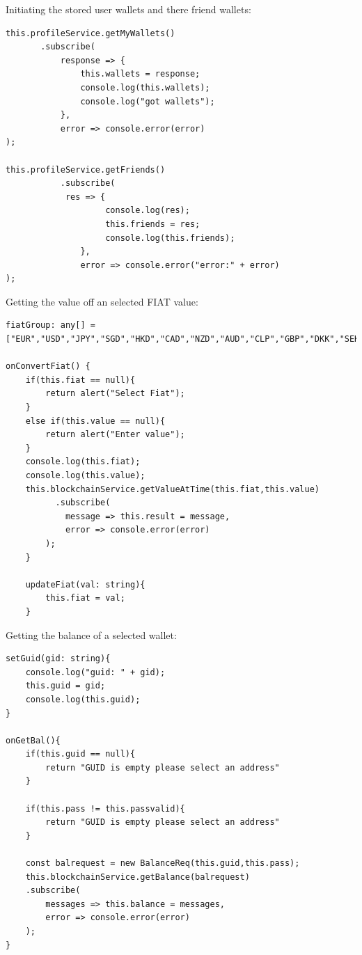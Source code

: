 Initiating the stored user wallets and there friend wallets:
\begin{lstlisting}
this.profileService.getMyWallets()
       .subscribe(
           response => {
               this.wallets = response;
               console.log(this.wallets);
               console.log("got wallets");
           },
           error => console.error(error)
);

this.profileService.getFriends()
           .subscribe(
            res => {
                    console.log(res);
                    this.friends = res;
                    console.log(this.friends);
               },
               error => console.error("error:" + error)
);
\end{lstlisting}

Getting the value off an selected FIAT value:
\begin{lstlisting}
fiatGroup: any[] = ["EUR","USD","JPY","SGD","HKD","CAD","NZD","AUD","CLP","GBP","DKK","SEK","ISK","CHF","BRL","RUB","PLN","THB","KRW","TWD"];

onConvertFiat() {
    if(this.fiat == null){
        return alert("Select Fiat");
    }
    else if(this.value == null){
        return alert("Enter value");
    }
    console.log(this.fiat);
    console.log(this.value);
    this.blockchainService.getValueAtTime(this.fiat,this.value)
          .subscribe(
            message => this.result = message,
            error => console.error(error)
        );
    }

    updateFiat(val: string){
        this.fiat = val;
    }

\end{lstlisting}

Getting the balance of a selected wallet:
\begin{lstlisting}
setGuid(gid: string){
    console.log("guid: " + gid);
    this.guid = gid;
    console.log(this.guid);
}

onGetBal(){
    if(this.guid == null){
        return "GUID is empty please select an address"
    }

    if(this.pass != this.passvalid){
        return "GUID is empty please select an address"
    }

    const balrequest = new BalanceReq(this.guid,this.pass);
    this.blockchainService.getBalance(balrequest)
    .subscribe(
        messages => this.balance = messages,
        error => console.error(error)
    );
}
\end{lstlisting}

